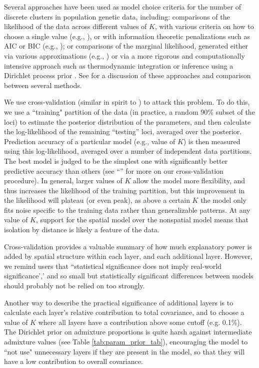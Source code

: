\documentclass[10pt,letterpaper]{article}
\newcommand{\secref}[1]{``\nameref{#1}''}
\begin{document}
Several approaches have been used as model choice criteria 
for the number of discrete clusters in population genetic data, including: 
comparisons of the likelihood of the data across different values of $K$,
with various criteria on how to choose a single value (e.g., \cite{Evanno2005}),
or with information theoretic penalizations such as AIC or BIC (e.g., \cite{ADMIXTURE});
or comparisons of the marginal likelihood, 
generated either via various approximations (e.g., \cite{STRUCTURE})
or via a more rigorous and computationally intensive approach such as thermodynamic integration \cite{verity_nichols2016}
or inference using a Dirichlet process prior \cite{huelsenbeck2007inference}.
See \cite{verity_nichols2016} for a discussion of these approaches and comparison
between several methods.

We use cross-validation (similar in spirit to \cite{ADMIXTURE_xval}) to attack this problem.
To do this,
we use a ``training" partition of the data (in practice, a random 90\% subset of the loci)
to estimate the posterior distribution of the parameters,
and then calculate the log-likelihood of the remaining ``testing'' loci,
averaged over the posterior.
Prediction accuracy of a particular model (e.g., value of $K$)
is then measured using this log-likelihood,
averaged over a number of independent data partitions.
The best model is judged to be the simplest one with significantly better predictive accuracy
than others (see \secref{Xvalidation} for more on our cross-validation procedure).
In general, larger values of $K$ allow the model more flexibility,
and thus increases the likelihood of the training partition, 
but this improvement in the likelihood will plateau (or even peak), 
as above a certain $K$ the model only fits noise specific to the training data 
rather than generalizable patterns.
At any value of $K$, support for the spatial model over the nonspatial model 
means that isolation by distance is likely a feature of the data.

Cross-validation provides a valuable summary of how much explanatory power
is added by spatial structure within each layer, and each additional layer.
However, we remind users that ``statistical significance does not imply real-world significance','
and so small but statistically significant differences between models
should probably not be relied on too strongly.

Another way to describe the practical significance of additional layers
is to calculate each layer's relative contribution to total covariance, 
and to choose a value of $K$ where all layers have a contribution above some cutoff (e.g. 0.1\%).
The Dirichlet prior on admixture proportions
is quite harsh against intermediate admixture values (see Table \ref{tab:param_prior_tab}),  
encouraging the model to ``not use" unnecessary layers if they are
present in the model, 
so that they will have a low contribution to overall covariance.
\end{document}
